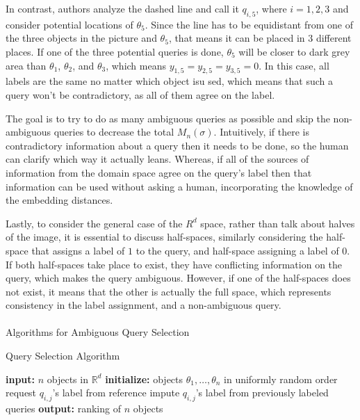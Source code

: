 \documentclass[
  letterpaper,
  numbers=noenddot,
  DIV=11,
  oneside]{scrreprt}
\makeatletter
\let\oldparagraph\paragraph
\renewcommand{\paragraph}{
    \@ifstar
      \xxxParagraphStar
      \xxxParagraphNoStar
  }
\newcommand{\xxxParagraphStar}[1]{\oldparagraph*{#1}\mbox{}}
\newcommand{\xxxParagraphNoStar}[1]{\oldparagraph{#1}\mbox{}}
\theoremstyle{remark}
\makeatother
\begin{document}
In contrast, authors analyze the dashed line and call it \(q_{i,5}\),
where \(i={1,2,3}\) and consider potential locations of \(\theta_5\).
Since the line has to be equidistant from one of the three objects in
the picture and \(\theta_5\), that means it can be placed in 3 different
places. If one of the three potential queries is done, \(\theta_5\) will
be closer to dark grey area than \(\theta_1\), \(\theta_2\), and
\(\theta_3\), which means \(y_{1,5} = y_{2,5} = y_{3,5} = 0\). In this
case, all labels are the same no matter which object isu sed, which
means that such a query won't be contradictory, as all of them agree on
the label.

The goal is to try to do as many ambiguous queries as possible and skip
the non-ambiguous queries to decrease the total \(M_n(\sigma)\).
Intuitively, if there is contradictory information about a query then it
needs to be done, so the human can clarify which way it actually leans.
Whereas, if all of the sources of information from the domain space
agree on the query's label then that information can be used without
asking a human, incorporating the knowledge of the embedding distances.

Lastly, to consider the general case of the \(R^d\) space, rather than
talk about halves of the image, it is essential to discuss half-spaces,
similarly considering the half-space that assigns a label of \(1\) to
the query, and half-space assigning a label of \(0\). If both
half-spaces take place to exist, they have conflicting information on
the query, which makes the query ambiguous. However, if one of the
half-spaces does not exist, it means that the other is actually the full
space, which represents consistency in the label assignment, and a
non-ambiguous query.

\paragraph{Algorithms for Ambiguous Query
Selection}\label{algorithms-for-ambiguous-query-selection}

\begin{algorithm}[H]
    \caption{Query Selection Algorithm}\label{fig:qsa_alg}
   \label{alg-qsa}
\begin{algorithmic}[1]
        \State \textbf{input:} $n$ objects in $\mathbb{R}^d$
        \State \textbf{initialize:} objects $\theta_1, \dots, \theta_n$ in uniformly random order
                    \State request $q_{i,j}$'s label from reference
                \Else
                    \State impute $q_{i,j}$'s label from previously labeled queries
                \EndIf
            \EndFor
        \EndFor
        \State \textbf{output:} ranking of $n$ objects
    \end{algorithmic}
\end{algorithm}
\end{document}
